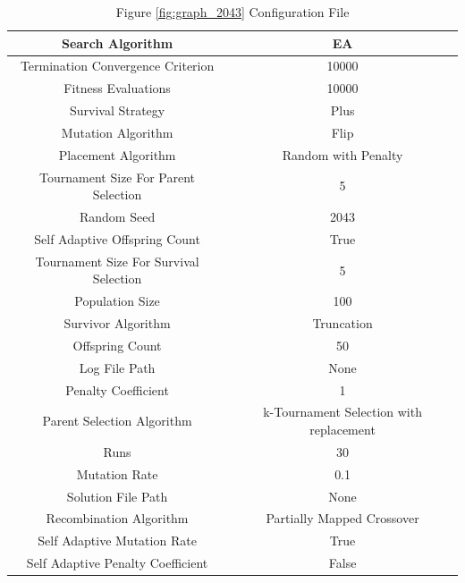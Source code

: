 \documentclass{standalone}
\begin{document}
\begin{table}[!htb]
	\centering
	\caption{Figure \ref{fig:graph_2043} Configuration File}
	\label{tab:graph_2043}
	\begin{tabular}{| c | c |}
		\hline
		Search Algorithm		& EA		 \\
		\hline
		Termination Convergence Criterion		& 10000		 \\
		\hline
		Fitness Evaluations		& 10000		 \\
		\hline
		Survival Strategy		& Plus		 \\
		\hline
		Mutation Algorithm		& Flip		 \\
		\hline
		Placement Algorithm		& Random with Penalty		 \\
		\hline
		Tournament Size For Parent Selection		& 5		 \\
		\hline
		Random Seed		& 2043		 \\
		\hline
		Self Adaptive Offspring Count		& True		 \\
		\hline
		Tournament Size For Survival Selection		& 5		 \\
		\hline
		Population Size		& 100		 \\
		\hline
		Survivor Algorithm		& Truncation		 \\
		\hline
		Offspring Count		& 50		 \\
		\hline
		Log File Path		& None		 \\
		\hline
		Penalty Coefficient		& 1		 \\
		\hline
		Parent Selection Algorithm		& k-Tournament Selection with replacement		 \\
		\hline
		Runs		& 30		 \\
		\hline
		Mutation Rate		& 0.1		 \\
		\hline
		Solution File Path		& None		 \\
		\hline
		Recombination Algorithm		& Partially Mapped Crossover		 \\
		\hline
		Self Adaptive Mutation Rate		& True		 \\
		\hline
		Self Adaptive Penalty Coefficient		& False		 \\
		\hline
	\end{tabular}
\end{table}
\end{document}
